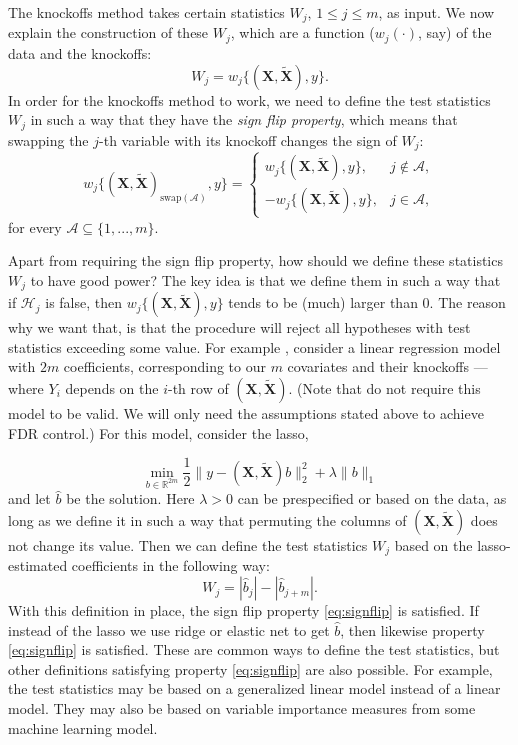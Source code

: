 \documentclass[11pt]{article}
\theoremstyle{plain}
\theoremstyle{definition}
\newcommand{\reals}{\mathbb{R}}
\newcommand{\A}{\mathcal{A}}
\newcommand{\Hy}{\mathcal{H}}
\newcommand{\citp}{\citep}
\begin{document}
 The knockoffs method takes certain statistics $W_j$, $1\leq j \leq m$, as input.
We now explain the construction of these $W_j$, which are a function ($w_j(\cdot)$, say) of the data and the knockoffs:
 $$W_j=w_j\big\{(\mathbf{X}, \tilde{\mathbf{X}}),y\big\}.$$
 In order for the knockoffs method to work, we need to define the test statistics $W_j$ in such a way that they have the \emph{sign flip property}, which means that swapping the $j$-th
 variable with its knockoff changes the sign of $W_j$:
 \begin{equation}\label{eq:signflip}
 w_j\big\{(\mathbf{X}, \tilde{\mathbf{X}})_{\text{swap}(\A)},y\big\} = 
 \begin{cases}
w_j\big\{(\mathbf{X}, \tilde{\mathbf{X}}),y\big\}, & j\not\in \A, \\
-w_j\big\{(\mathbf{X}, \tilde{\mathbf{X}}),y\big\},  & j\in \A,
\end{cases}
 \end{equation}
 for every $\A\subseteq \{1,...,m\}$.
 
Apart from requiring the sign flip property, how should we define these statistics $W_j$ to have good power? The key idea is that we define them in such a way that if $\Hy_j$ is false, then $w_j\big\{(\mathbf{X}, \tilde{\mathbf{X}}),y\big\}$ tends to be (much) larger than 0. The reason why we want that, is that the procedure will reject all hypotheses with test statistics exceeding some value. For example \citp[][p.561]{candes2018panning}, consider a linear regression model with $2m$ coefficients, corresponding to our $m$ covariates and their knockoffs --- where $Y_i$ depends on the $i$-th row of $(\mathbf{X}, \tilde{\mathbf{X}})$. (Note that do not require this model to be valid. We will only need the assumptions stated above to achieve FDR control.) For this model, consider the lasso,

$$ \min_{b\in \reals^{2m}} \frac{1}{2} \lVert y - (\mathbf{X}, \tilde{\mathbf{X}}) b\rVert^2_2 +\lambda  \lVert b \rVert_1 $$
and let $\hat{b}$ be the solution. Here $\lambda>0$ can be prespecified or based on the data, as long as we define it in such a way that permuting the columns of $(\mathbf{X}, \tilde{\mathbf{X}})$ does not change its value.
Then we can define the test statistics $W_j$ based on the lasso-estimated coefficients in the following way:
$$W_j  = |\hat{b}_j| - |\hat{b}_{j+m}|.$$
With this definition in place, the sign flip property \eqref{eq:signflip} is satisfied. If instead of the lasso we use ridge or elastic net to get $\hat{b}$, then likewise property \eqref{eq:signflip} is satisfied. These are common ways to define the test statistics, but other definitions satisfying property \eqref{eq:signflip} are also possible. For example, the test statistics may be based on a generalized linear model instead of a linear model. They may also be based on variable importance measures from some machine learning model.
\end{document}
